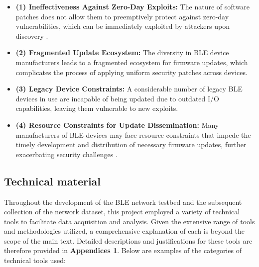 \begin{itemize}[leftmargin=0.1cm]
    \setlength{\itemsep}{-0.1cm}
    \item \textbf{(1) Ineffectiveness Against Zero-Day Exploits:} The nature of software patches does not allow them to preemptively protect against zero-day vulnerabilities, which can be immediately exploited by attackers upon discovery \cite{stellios2019advanced}.
    \item \textbf{(2) Fragmented Update Ecosystem:} The diversity in BLE device manufacturers leads to a fragmented ecosystem for firmware updates, which complicates the process of applying uniform security patches across devices.
    \item \textbf{(3) Legacy Device Constraints: }A considerable number of legacy BLE devices in use are incapable of being updated due to outdated I/O capabilities, leaving them vulnerable to new exploits.
    \item \textbf{(4) Resource Constraints for Update Dissemination:} Many manufacturers of BLE devices may face resource constraints that impede the timely development and distribution of necessary firmware updates, further exacerbating security challenges \cite{antonioli2020key}.
\end{itemize}

\subsection{Technical material}



\noindent Throughout the development of the BLE network testbed and the subsequent collection of the network dataset, this project employed a variety of technical tools to facilitate data acquisition and analysis. Given the extensive range of tools and methodologies utilized, a comprehensive explanation of each is beyond the scope of the main text. Detailed descriptions and justifications for these tools are therefore provided in \textbf{Appendices 1}. Below are examples of the categories of technical tools used:

